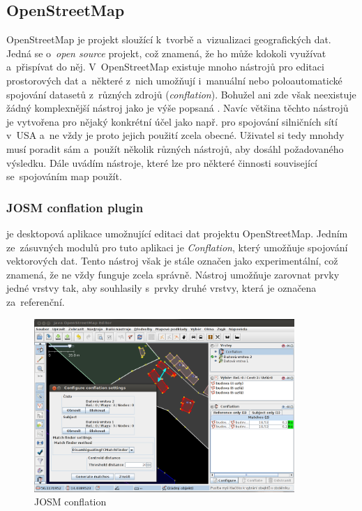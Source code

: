 \subsection{OpenStreetMap}
\label{OSM}

OpenStreetMap je projekt sloužící k~tvorbě a~vizualizaci geografických dat.
Jedná se o~\textit{open source} projekt, což znamená, že ho může kdokoli 
využívat a~přispívat do něj. V~OpenStreetMap existuje mnoho nástrojů 
pro editaci prostorových dat a~některé z~nich umožňují i~manuální nebo
poloautomatické spojování datasetů z~různých zdrojů (\textit{conflation}). 
Bohužel ani zde však neexistuje žádný komplexnější nástroj jako je výše
popsaná . Navíc většina těchto nástrojů je vytvořena pro nějaký
konkrétní účel jako např. pro spojování silničních sítí v~USA a~ne vždy
je proto jejich použití zcela obecné. Uživatel si tedy mnohdy musí poradit
sám a~použít několik různých nástrojů, aby dosáhl požadovaného výsledku.
Dále uvádím nástroje, které lze pro některé činnosti související 
se~spojováním map použít. 

\subsubsection{JOSM conflation plugin}

 je desktopová aplikace umožnující
editaci dat projektu OpenStreetMap. Jedním ze~zásuvných modulů pro tuto 
aplikaci je \textit{Conflation}, který umožňuje spojování vektorových dat. 
Tento nástroj však je stále označen jako experimentální, což znamená, že ne 
vždy funguje zcela správně. Nástroj umožňuje zarovnat prvky jedné vrstvy tak,
aby souhlasily s~prvky druhé vrstvy, která je označena za~referenční. 

\label{josmpic}
  \begin{figure}[hbt]
    \centering
      \includegraphics[width=280pt]{./pictures/josm.png}
      \caption{JOSM conflation}
      \label{fig:josm}
  \end{figure} 


